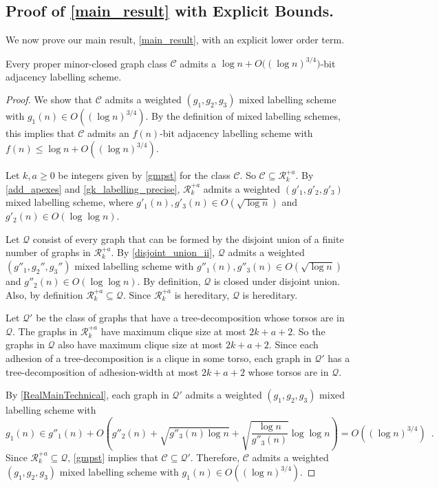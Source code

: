 \documentclass[twoside,leqno]{article}
\renewcommand{\le}{\leqslant}
\renewcommand{\geq}{\geqslant}
\newcommand{\Oh}{O}
\begin{document}
\subsection{Proof of \texorpdfstring{\cref{main_result}}{Theorem \ref*{main_result}} with Explicit Bounds.}

We now prove our main result, \cref{main_result}, with an explicit lower order term.

\begin{lem}
  \label{main_result_detailed}
  Every proper minor-closed graph class $\mathcal{C}$  admits a $\log n + \Oh\big((\log n)^{3/4}\big)$-bit adjacency labelling scheme.
\end{lem}

\begin{proof}
  We show that $\mathcal{C}$ admits a weighted $(g_1,g_2,g_3)$ mixed labelling scheme with $g_1(n) \in \Oh((\log n)^{3/4})$. By the definition of mixed labelling schemes, this implies that $\mathcal{C}$ admits an $f(n)$-bit adjacency labelling scheme with $f(n)\le\log n + \Oh((\log n)^{3/4})$.

  Let $k,a\geq 0$ be integers given by \cref{gmpst} for the class $\mathcal{C}$. So $\mathcal{C}\subseteq \mathcal{R}_k^{+a}$. By \cref{add_apexes} and \cref{gk_labelling_precise}, $\mathcal{R}_k^{+a}$ admits a weighted $(g'_1,g'_2,g'_3)$ mixed labelling scheme, where $g'_1(n),g'_3(n)\in \Oh(\sqrt{\log n})$ and $g'_2(n)\in \Oh(\log\log n)$.

  Let $\mathcal{Q}$ consist of every graph that can be formed by the disjoint union of a finite number of graphs in $\mathcal{R}_k^{+a}$.  By \cref{disjoint_union_ii}, $\mathcal{Q}$ admits a weighted $(g''_1,g_2'',g_3'')$ mixed labelling scheme with $g''_1(n),g''_3(n)\in \Oh(\sqrt{\log n})$ and $g''_2(n)\in \Oh(\log\log n)$.   By definition, $\mathcal{Q}$ is closed under disjoint union.  Also, by definition  $\mathcal{R}_k^{+a}\subseteq\mathcal{Q}$. Since $\mathcal{R}_k^{+a}$ is hereditary, $\mathcal{Q}$ is hereditary.

  Let $\mathcal{Q}'$ be the class of graphs that have a tree-decomposition whose torsos are in $\mathcal{Q}$.  The graphs in $\mathcal{R}_k^{+a}$ have maximum clique size at most $2k+a+2$.  So the graphs in $\mathcal{Q}$ also have maximum clique size at most $2k+a+2$. Since each adhesion of a tree-decomposition is a clique in some torso,   each graph in $\mathcal{Q}'$ has a tree-decomposition 
  of adhesion-width at most $2k+a+2$ whose torsos are in $\mathcal{Q}$.

  By \cref{RealMainTechnical}, each graph in $\mathcal{Q}'$ admits a weighted $(g_1,g_2,g_3)$ mixed labelling scheme with
  \[
    g_1(n) \in g''_1(n) + \Oh\left(g''_2(n) + \sqrt{g''_3(n)\log n}
    + \sqrt{\frac{\log n}{g''_3(n)}}\log\log n\right) = \Oh((\log n)^{3/4}) \enspace.
  \]
  Since $\mathcal{R}_k^{+a}\subseteq\mathcal{Q}$, \cref{gmpst} implies that $\mathcal{C}\subseteq\mathcal{Q}'$.  Therefore, $\mathcal{C}$ admits a weighted $(g_1,g_2,g_3)$ mixed labelling scheme with $g_1(n)\in \Oh((\log n)^{3/4})$.
\end{proof}
\end{document}
